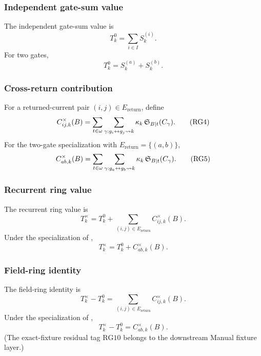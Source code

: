\subsubsection{Independent gate-sum value}\label{subsec:frg-independent-gate-sum}
The independent gate-sum value is
\begin{equation*}
T_k^0=\sum_{i\in I}S_k^{(i)}.
\tag{RG2}\label{eq:frg-independent-gate-sum}
\end{equation*}
For two gates,
\begin{equation*}
T_k^0=S_k^{(a)}+S_k^{(b)}.
\tag{RG3}\label{eq:frg-independent-two-gate}
\end{equation*}

\subsubsection{Cross-return contribution}\label{subsec:frg-cross-return-contribution}
For a returned-current pair \((i,j)\in E_{\mathrm{return}}\), define
\begin{equation*}
C_{ij,k}^{\times}(B)
=
\sum_{t\in\omega}
\sum_{\gamma:g_i\leftrightarrow g_j\leadsto k}
\kappa_k\,
\mathfrak S_{B|t}(C_\gamma).
\tag{RG4}\label{eq:frg-cross-return-contribution}
\end{equation*}
For the two-gate specialization with
\(E_{\mathrm{return}}=\{(a,b)\}\),
\begin{equation*}
C_{ab,k}^{\times}(B)
=
\sum_{t\in\omega}
\sum_{\gamma:g_a\leftrightarrow g_b\leadsto k}
\kappa_k\,
\mathfrak S_{B|t}(C_\gamma).
\tag{RG5}\label{eq:frg-cross-return-two-gate}
\end{equation*}

\subsubsection{Recurrent ring value}\label{subsec:frg-recurrent-ring-value}
The recurrent ring value is
\begin{equation*}
T_k^\times
=
T_k^0+
\sum_{(i,j)\in E_{\mathrm{return}}}
C_{ij,k}^{\times}(B).
\tag{RG6}\label{eq:frg-recurrent-ring-value}
\end{equation*}
Under the specialization of ,
\begin{equation*}
T_k^\times=T_k^0+C_{ab,k}^{\times}(B).
\tag{RG7}\label{eq:frg-recurrent-two-gate}
\end{equation*}

\subsubsection{Field-ring identity}\label{subsec:frg-identity}
The field-ring identity is
\begin{equation*}
T_k^\times-T_k^0
=
\sum_{(i,j)\in E_{\mathrm{return}}}
C_{ij,k}^{\times}(B).
\tag{RG8}\label{eq:frg-identity}
\end{equation*}
Under the specialization of ,
\begin{equation*}
T_k^\times-T_k^0=C_{ab,k}^{\times}(B).
\tag{RG9}\label{eq:frg-identity-two-gate}
\end{equation*}
(The exact-fixture residual tag \(\mathrm{RG10}\) belongs to the downstream Manual fixture layer.)


